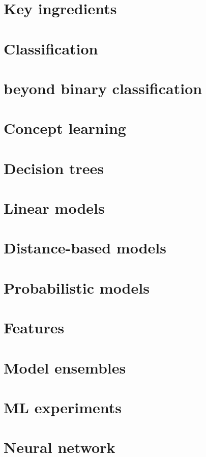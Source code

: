 \documentclass[8pt]{extarticle} %
\begin{document}
\tiny
\raggedright
\begin{multicols}{3}
\section{Key ingredients}

\section{Classification}

\section{beyond binary classification}

\section{Concept learning}

\section{Decision trees}

\section{Linear models}

\section{Distance-based models}

\section{Probabilistic models}

\section{Features}

\section{Model ensembles}

\section{ML experiments}

\section{Neural network}

\end{multicols}
\end{document}
